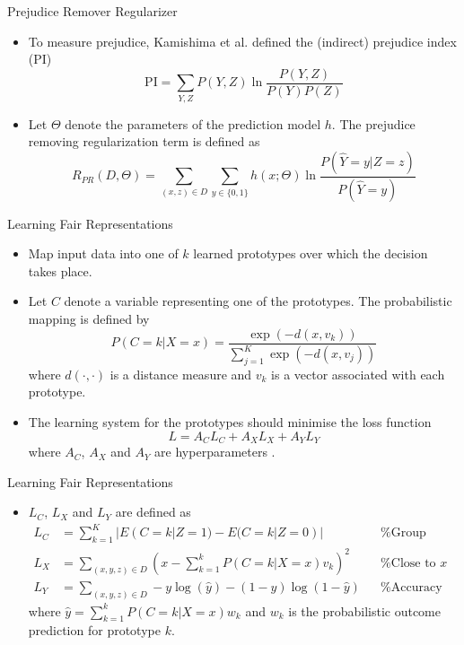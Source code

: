 \documentclass[10pt, xcolor=table,aspectratio=169]{beamer}
\begin{document}
\begin{frame}{Prejudice Remover Regularizer}
	\begin{itemize}
		\item To measure prejudice, Kamishima et al. defined the (indirect) prejudice index (PI)
		      \[\text{PI}=\sum_{Y,Z} P(Y,Z)\ln\frac{P(Y,Z)}{P(Y)P(Z)} \]
		\item Let $\Theta$ denote the parameters of the prediction model $h$. The prejudice removing regularization term is defined as \cite{kamishima2012fairness} 
		      \[R_{PR}(D,\Theta)=\sum_{(x,z)\in D}\sum_{y\in \{0,1\}} h(x;\Theta)\ln \frac{P(\hat{Y}=y|Z=z)}{P(\hat{Y}=y)}\]

	\end{itemize}

\end{frame}


\begin{frame}{Learning Fair Representations}
	\begin{itemize}
		\item Map input data into one of $k$ learned prototypes over which the decision takes place.
		\item Let $C$ denote a variable representing one of the prototypes. The probabilistic mapping is defined by
		      \[ P(C=k|X=x)=\frac{\exp(-d(x,v_k))}{\sum_{j=1}^K \exp(-d(x,v_j))}\]
		      where $d(\cdot,\cdot)$ is a distance measure and $v_k$ is a vector associated with each prototype.
		\item The learning system for the prototypes should minimise the loss function \[L=A_CL_C+A_XL_X+A_YL_Y\]
		      where $A_C$, $A_X$ and $A_Y$ are hyperparameters \cite{zafar2017fairness}.

	\end{itemize}

\end{frame}

\begin{frame}{Learning Fair Representations}
	\begin{itemize}
		\item  $L_C$, $L_X$ and $L_Y$ are defined as
		      \begin{align*}
			      L_C & =\sum_{k=1}^K |E(C=k|Z=1)-E(C=k|Z=0)|                            &  & \text{\% Group Fairness} \\
			      L_X & =\sum_{(x,y,z)\in D} \left(x-\sum_{k=1}^k P(C=k|X=x)v_k\right)^2 &  & \text{\% Close to $x$}   \\
			      L_Y & =\sum_{(x,y,z)\in D} -y\log(\hat{y})-(1-y)\log(1-\hat{y})        &  & \text{\% Accuracy}
		      \end{align*}
		      where $\hat{y}=\sum_{k=1}^k P(C=k|X=x)w_k$ and $w_k$ is the probabilistic outcome prediction for prototype $k$.
	\end{itemize}

\end{frame}
\end{document}

